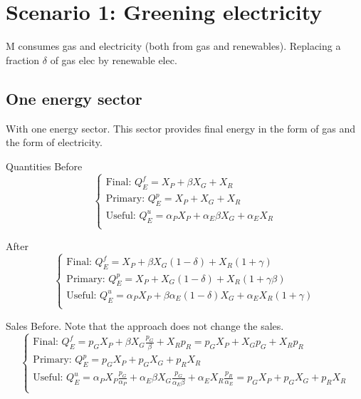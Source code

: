\documentclass[11pt]{article}
\begin{document}
\section{Scenario 1: Greening electricity}

M consumes gas and electricity (both from gas and renewables). Replacing a fraction $\delta$ of gas elec by renewable elec. 

\subsection{One energy sector}

With one energy sector. 
This sector provides final energy in the form of gas and the form of electricity. 

Quantities
Before
\begin{equation*}
    \begin{cases}
        \text{Final: }Q_E^f=X_P+\beta X_G+X_R \\
         \text{Primary: }Q_E^p=X_P+ X_G+X_R \\
        \text{Useful: }Q_E^u=\alpha_P X_P+ \alpha_E\beta X_G+\alpha_E X_R \\
    \end{cases}
\end{equation*}

After
\begin{equation*}
    \begin{cases}
        \text{Final: }Q_E^f=X_P+\beta X_G(1-\delta)+X_R(1+\gamma)\\
         \text{Primary: }Q_E^p= X_P+ X_G(1-\delta)+X_R(1+\gamma\beta) \\
        \text{Useful: }Q_E^u=\alpha_P X_P+ \beta\alpha_E (1-\delta) X_G+\alpha_E X_R (1+\gamma)  \\
    \end{cases}
\end{equation*}

Sales
Before. Note that the approach does not change the sales.
\begin{equation*}
    \begin{cases}
        \text{Final: }Q_E^f=p_GX_P+\beta X_G\frac{p_G}{\beta}+X_Rp_R=p_GX_P+ X_Gp_G+X_Rp_R \\
         \text{Primary: }Q_E^p=p_GX_P+ p_GX_G+p_RX_R \\
        \text{Useful: }Q_E^u=\alpha_P X_P\frac{p_G}{\alpha_P}+ \alpha_E\beta X_G\frac{p_G}{\alpha_E\beta}+\alpha_E X_R\frac{p_R}{\alpha_E}=p_GX_P+ p_GX_G+p_RX_R \\
    \end{cases}
\end{equation*}
\end{document}
